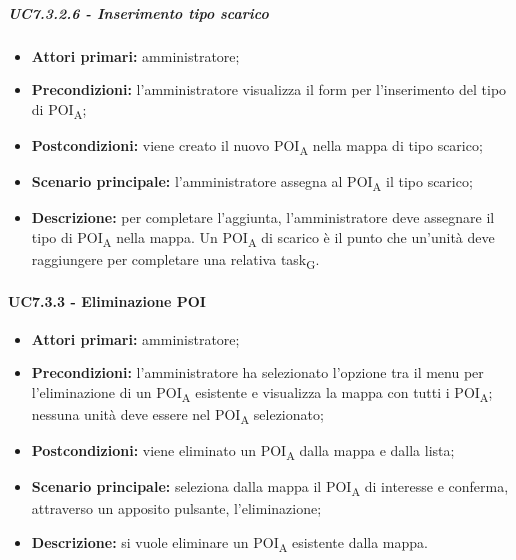 \subparagraph{UC7.3.2.6 - Inserimento tipo scarico}

\begin{itemize}

   \item   \textbf{Attori primari:} amministratore;

   \item   \textbf{Precondizioni:} l'amministratore visualizza il form per l'inserimento del tipo di POI\textsubscript{A};

   \item   \textbf{Postcondizioni:} viene creato il nuovo POI\textsubscript{A} nella mappa di tipo scarico; 

   \item   \textbf{Scenario principale:} l'amministratore assegna al POI\textsubscript{A} il tipo scarico;

  \item   \textbf{Descrizione:} per completare l'aggiunta, l'amministratore deve assegnare il tipo di POI\textsubscript{A} nella mappa. Un POI\textsubscript{A} di scarico è il punto che un'unità deve raggiungere per completare una relativa task\textsubscript{G}.



\end{itemize}





\paragraph{UC7.3.3 - Eliminazione POI}

\begin{itemize}

   \item   \textbf{Attori primari:} amministratore;

   \item   \textbf{Precondizioni:} l'amministratore ha selezionato l'opzione tra il menu per l'eliminazione di un POI\textsubscript{A} esistente e visualizza la mappa con tutti i POI\textsubscript{A}; nessuna unità deve essere nel POI\textsubscript{A} selezionato;

   \item   \textbf{Postcondizioni:} viene eliminato un POI\textsubscript{A} dalla mappa e dalla lista; 

   \item   \textbf{Scenario principale:} seleziona dalla mappa il POI\textsubscript{A} di interesse e conferma, attraverso un apposito pulsante, l'eliminazione;

   \item   \textbf{Descrizione:} si vuole eliminare un POI\textsubscript{A} esistente dalla mappa.

\end{itemize}
